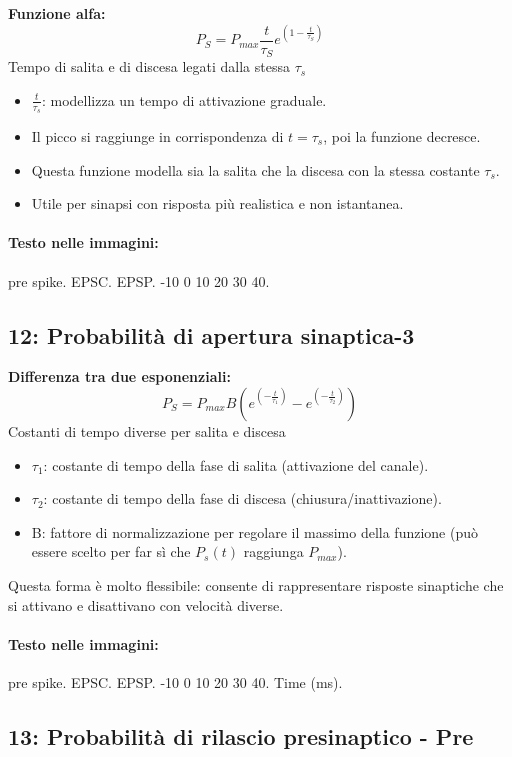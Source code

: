 \textbf{Funzione alfa:}
\[ P_{S} = P_{max} \frac{t}{\tau_{S}} e^{\left(1-\frac{t}{\tau_{S}}\right)} \]
Tempo di salita e di discesa legati dalla stessa $\tau_{s}$
\begin{itemize}
    \item $\frac{t}{\tau_{s}}$: modellizza un tempo di attivazione graduale.
    \item Il picco si raggiunge in corrispondenza di $t=\tau_{s}$, poi la funzione decresce.
    \item Questa funzione modella sia la salita che la discesa con la stessa costante $\tau_{s}$.
    \item Utile per sinapsi con risposta più realistica e non istantanea.
\end{itemize}

\paragraph*{Testo nelle immagini:}
pre spike. EPSC. EPSP. -10 0 10 20 30 40.


\subsection*{ 12: Probabilità di apertura sinaptica-3}

\textbf{Differenza tra due esponenziali:}
\[ P_{S} = P_{max} B \left( e^{\left(-\frac{t}{\tau_{1}}\right)} - e^{\left(-\frac{t}{\tau_{2}}\right)} \right) \]
Costanti di tempo diverse per salita e discesa
\begin{itemize}
    \item $\tau_{1}$: costante di tempo della fase di salita (attivazione del canale).
    \item $\tau_{2}$: costante di tempo della fase di discesa (chiusura/inattivazione).
    \item B: fattore di normalizzazione per regolare il massimo della funzione (può essere scelto per far sì che $P_{s}(t)$ raggiunga $P_{max}$).
\end{itemize}
Questa forma è molto flessibile: consente di rappresentare risposte sinaptiche che si attivano e disattivano con velocità diverse.

\paragraph*{Testo nelle immagini:}
pre spike. EPSC. EPSP. -10 0 10 20 30 40. Time (ms).


\subsection*{ 13: Probabilità di rilascio presinaptico - Pre}

